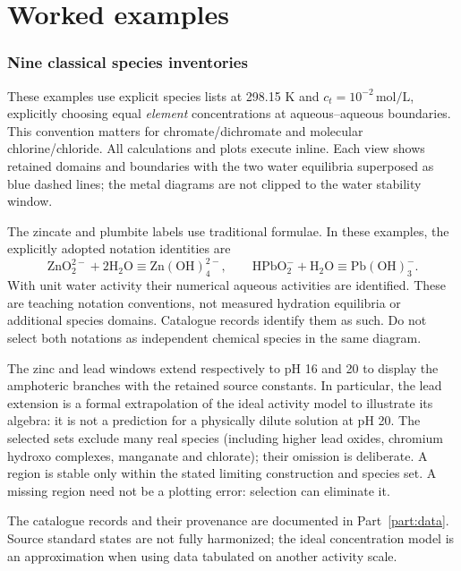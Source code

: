 \documentclass[a4paper,11pt]{ltxdoc}
\begin{document}
\clearpage\part{Worked examples}\label{part:examples}
\section{Nine classical species inventories}
\label{sec:gallery}
These examples use explicit species lists at 298.15 K and
$c_t=10^{-2}\,\mathrm{mol/L}$, explicitly choosing equal \emph{element}
concentrations at aqueous--aqueous boundaries. This convention matters for
chromate/dichromate and molecular chlorine/chloride. All calculations and plots
execute inline. Each view shows retained domains and boundaries with the two
water equilibria superposed as blue dashed lines; the metal diagrams are not
clipped to the water stability window.

The zincate and plumbite labels use traditional formulae. In these examples, the explicitly adopted notation identities are
\[
 \mathrm{ZnO}_2^{2-}+2\mathrm{H}_2\mathrm O
   \equiv\mathrm{Zn(OH)}_4^{2-},\qquad
 \mathrm{HPbO}_2^-+\mathrm{H}_2\mathrm O
   \equiv\mathrm{Pb(OH)}_3^-.
\]
With unit water activity their numerical aqueous activities are identified.
These are teaching notation conventions, not measured hydration equilibria or
additional species domains. Catalogue records identify them as such. Do not
select both notations as independent chemical species in the same diagram.

The zinc and lead windows extend respectively to pH 16 and 20 to display the
amphoteric branches with the retained source constants. In particular, the lead
extension is a formal extrapolation of the ideal activity model to illustrate
its algebra: it is not a prediction for a physically dilute solution at pH 20.
The selected sets exclude many real species (including higher lead oxides,
chromium hydroxo complexes, manganate and chlorate); their omission is deliberate.
A region is stable only within the stated limiting construction and species set.
A missing region need not be a plotting error: selection can eliminate it.

The catalogue records and their provenance are documented in Part~\ref{part:data}.
Source standard states are not fully harmonized; the ideal concentration model
is an approximation when using data tabulated on another activity scale.
\end{document}
